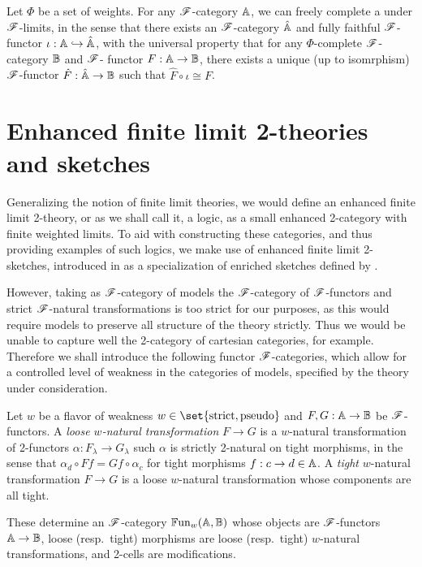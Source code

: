 \documentclass[../thesis.tex]{subfiles}
\begin{document}
  \begin{theorem}\label{thm:free completion}
    Let $\Phi$ be a set of weights. For any ${\mathscr{F}}$-category ${\mathbb{A}}$, we can freely complete a under ${\mathscr{F}}$-limits,
    in the sense that there exists an ${\mathscr{F}}$-category $\hat{{\mathbb{A}}}$ and fully faithful ${\mathscr{F}}$-functor $\iota : {\mathbb{A}}
    \hookrightarrow \hat {{\mathbb{A}}}$, with the universal property that for any $\Phi$-complete ${\mathscr{F}}$-category ${\mathbb{B}}$ and ${\mathscr{F}}$-%
    functor $F : {\mathbb{A}} \to {\mathbb{B}}$, there exists a unique (up to isomrphism) ${\mathscr{F}}$-functor $\hat F : \hat{{\mathbb{A}}} \to {\mathbb{B}}$
    such that $\hat F \circ \iota \cong F$.
  \end{theorem}


  \section{Enhanced finite limit 2-theories and sketches}
  Generalizing the notion of finite limit theories, we would define an enhanced finite limit 2-theory,
  or as we shall call it, a logic, as a small enhanced 2-category with finite weighted limits. To aid
  with constructing these categories, and thus providing examples of such logics, we make use of
  enhanced finite limit 2-sketches, introduced in \cite{arkor2024} as a specialization of enriched
  sketches defined by \cite{kelly1982a}. 

  However, taking as ${\mathscr{F}}$-category of models the ${\mathscr{F}}$-category of ${\mathscr{F}}$-functors and strict ${\mathscr{F}}$-natural
  transformations is too strict for our purposes, as this would require models to preserve all structure
  of the theory strictly. Thus we would be unable to capture well the 2-category of cartesian categories,
  for example. Therefore we shall introduce the following functor ${\mathscr{F}}$-categories, which allow for a
  controlled level of weakness in the categories of models, specified by the theory under consideration.
  
  \begin{definition}
    Let $w$ be a flavor of weakness $w \in \set{\text{strict},\text{pseudo}}$ and $F, G : {\mathbb{A}} \to {\mathbb{B}}$
    be ${\mathscr{F}}$-functors. A \emph{loose $w$-natural transformation} $F \to G$ is a $w$-natural transformation
    of 2-functors $\alpha : F_\lambda \to G_\lambda$ such $\alpha$ is strictly 2-natural on tight morphisms,
    in the sense that $\alpha_d \circ F f = G f \circ \alpha_c$ for tight morphisms $f : c \to d \in {\mathbb{A}}$. 
    A \emph{tight} $w$-natural transformation $F \to G$ is a loose $w$-natural transformation whose components
    are all tight.

    These determine an ${\mathscr{F}}$-category ${\mathbb{F}\mathrm{un}}_w({\mathbb{A}},{\mathbb{B}})$ whose objects are ${\mathscr{F}}$-functors ${\mathbb{A}} \to
    {\mathbb{B}}$, loose (resp.\ tight) morphisms are loose (resp.\ tight) $w$-natural transformations,
    and 2-cells are modifications. 
  \end{definition}
\end{document}
